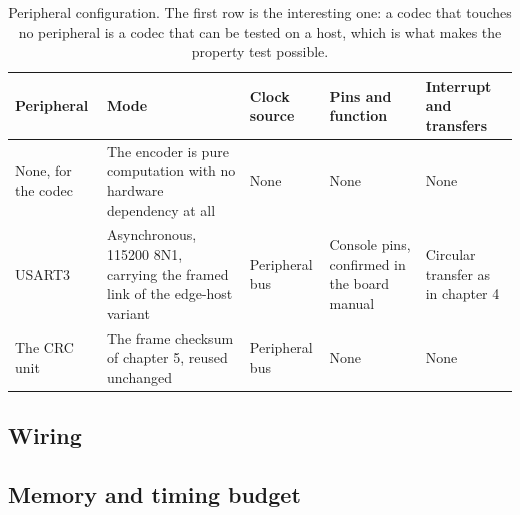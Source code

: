 \begin{table}[H]\centering\small
\begin{tabular}{p{22mm}p{26mm}p{24mm}p{30mm}p{30mm}}
\toprule
Peripheral & Mode & Clock source & Pins and function & Interrupt and transfers \\
\midrule
None, for the codec & The encoder is pure computation with no hardware dependency at all & None & None & None \\
USART3 & Asynchronous, 115200 8N1, carrying the framed link of the edge-host variant & Peripheral bus & Console pins, confirmed in the board manual & Circular transfer as in chapter 4 \\
The CRC unit & The frame checksum of chapter 5, reused unchanged & Peripheral bus & None & None \\
\bottomrule
\end{tabular}
\caption{Peripheral configuration. The first row is the interesting one: a codec that touches no peripheral is a codec that can be tested on a host, which is what makes the property test possible.}
\end{table}

\subsection*{Wiring}


\subsection*{Memory and timing budget}


